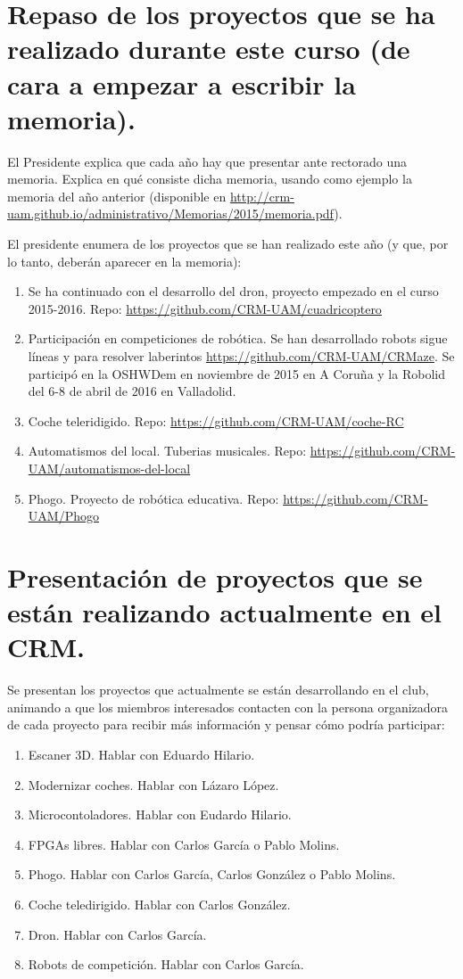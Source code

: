 \documentclass[a4paper]{article}
\begin{document}
\section{Repaso de los proyectos que se ha realizado durante este curso (de cara a empezar a escribir la memoria).}

El Presidente explica que cada año hay que presentar ante rectorado una memoria. Explica en qué consiste dicha memoria, usando como ejemplo la memoria del año anterior (disponible en \url{http://crm-uam.github.io/administrativo/Memorias/2015/memoria.pdf}).

El presidente enumera de los proyectos que se han realizado este año (y que, por lo tanto, deberán aparecer en la memoria):

\begin{enumerate}
\item Se ha continuado con el desarrollo del dron, proyecto empezado en el curso 2015-2016. Repo: \url{https://github.com/CRM-UAM/cuadricoptero}
\item Participación en competiciones de robótica. Se han desarrollado robots sigue líneas y para resolver laberintos \url{https://github.com/CRM-UAM/CRMaze}. Se participó en la OSHWDem en noviembre de 2015 en A Coruña y la Robolid del 6-8 de abril de 2016 en Valladolid.
\item Coche teleridigido. Repo: \url{https://github.com/CRM-UAM/coche-RC}
\item Automatismos del local. Tuberias musicales. Repo: \url{https://github.com/CRM-UAM/automatismos-del-local}
\item Phogo. Proyecto de robótica educativa. Repo: \url{https://github.com/CRM-UAM/Phogo}
\end{enumerate}

\section{Presentación de proyectos que se están realizando actualmente en el CRM.}

Se presentan los proyectos que actualmente se están desarrollando en el club, animando a que los miembros interesados contacten con la persona organizadora de cada proyecto para recibir más información y pensar cómo podría participar:

\begin{enumerate}
\item Escaner 3D. Hablar con Eduardo Hilario.
\item Modernizar coches. Hablar con Lázaro López.
\item Microcontoladores. Hablar con Eudardo Hilario.
\item FPGAs libres. Hablar con Carlos García o Pablo Molins.
\item Phogo. Hablar con Carlos García, Carlos González o Pablo Molins.
\item Coche teledirigido. Hablar con Carlos González.
\item Dron. Hablar con Carlos García.
\item Robots de competición. Hablar con Carlos García.
\end{enumerate}
\end{document}
